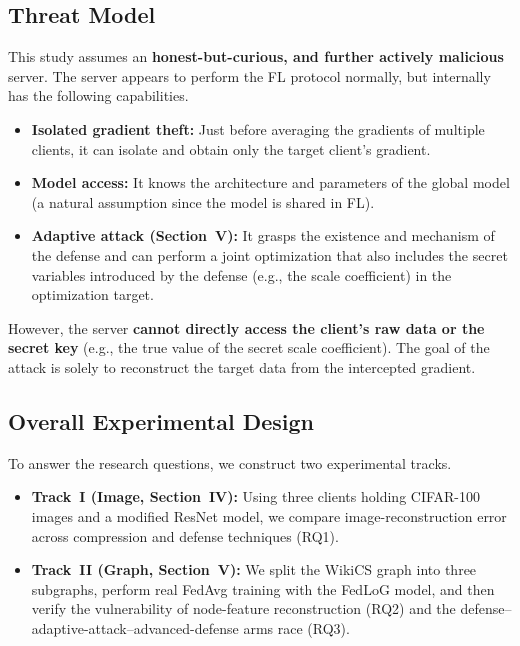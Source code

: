 \documentclass[conference]{IEEEtran}
\begin{document}
\subsection{Threat Model}
This study assumes an \textbf{honest-but-curious, and further actively
malicious} server. The server appears to perform the FL protocol normally, but
internally has the following capabilities.
\begin{itemize}
\item \textbf{Isolated gradient theft:} Just before averaging the gradients of
multiple clients, it can isolate and obtain only the target client's gradient.
\item \textbf{Model access:} It knows the architecture and parameters of the
global model (a natural assumption since the model is shared in FL).
\item \textbf{Adaptive attack (Section~V):} It grasps the existence and
mechanism of the defense and can perform a joint optimization that also includes
the secret variables introduced by the defense (e.g., the scale coefficient) in
the optimization target.
\end{itemize}
However, the server \textbf{cannot directly access the client's raw data or the
secret key} (e.g., the true value of the secret scale coefficient). The goal of
the attack is solely to reconstruct the target data from the intercepted
gradient.

\subsection{Overall Experimental Design}
To answer the research questions, we construct two experimental tracks.
\begin{itemize}
\item \textbf{Track~I (Image, Section~IV):} Using three clients holding
CIFAR-100 images and a modified ResNet model, we compare image-reconstruction
error across compression and defense techniques (RQ1).
\item \textbf{Track~II (Graph, Section~V):} We split the WikiCS graph into three
subgraphs, perform real FedAvg training with the FedLoG model, and then verify
the vulnerability of node-feature reconstruction (RQ2) and the
defense--adaptive-attack--advanced-defense arms race (RQ3).
\end{itemize}
\end{document}
